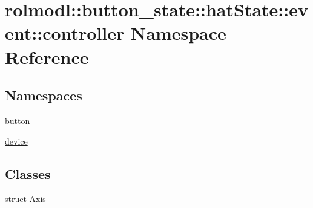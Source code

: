 \hypertarget{namespacerolmodl_1_1button__state_1_1hat_state_1_1event_1_1controller}{}\section{rolmodl\+::button\+\_\+state\+::hat\+State\+::event\+::controller Namespace Reference}
\label{namespacerolmodl_1_1button__state_1_1hat_state_1_1event_1_1controller}
\subsection*{Namespaces}
\begin{DoxyCompactItemize}
\item 
 \mbox{\hyperlink{namespacerolmodl_1_1button__state_1_1hat_state_1_1event_1_1controller_1_1button}{button}}
\item 
 \mbox{\hyperlink{namespacerolmodl_1_1button__state_1_1hat_state_1_1event_1_1controller_1_1device}{device}}
\end{DoxyCompactItemize}
\subsection*{Classes}
\begin{DoxyCompactItemize}
\item 
struct \mbox{\hyperlink{structrolmodl_1_1button__state_1_1hat_state_1_1event_1_1controller_1_1_axis}{Axis}}
\end{DoxyCompactItemize}
